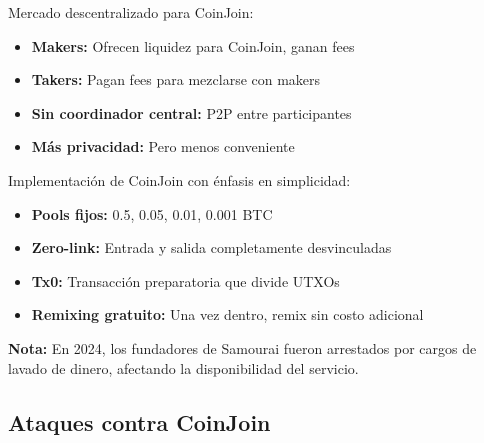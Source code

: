 \documentclass[11pt,a4paper,twoside]{book}
\begin{document}
\begin{definition}[JoinMarket]
Mercado descentralizado para CoinJoin:
\begin{itemize}
    \item \textbf{Makers:} Ofrecen liquidez para CoinJoin, ganan fees
    \item \textbf{Takers:} Pagan fees para mezclarse con makers
    \item \textbf{Sin coordinador central:} P2P entre participantes
    \item \textbf{M\'as privacidad:} Pero menos conveniente
\end{itemize}
\end{definition}

\begin{definition}
Implementaci\'on de CoinJoin con \'enfasis en simplicidad:
\begin{itemize}
    \item \textbf{Pools fijos:} 0.5, 0.05, 0.01, 0.001 BTC
    \item \textbf{Zero-link:} Entrada y salida completamente desvinculadas
    \item \textbf{Tx0:} Transacci\'on preparatoria que divide UTXOs
    \item \textbf{Remixing gratuito:} Una vez dentro, remix sin costo adicional
\end{itemize}

\textbf{Nota:} En 2024, los fundadores de Samourai fueron arrestados por cargos de lavado de dinero, afectando la disponibilidad del servicio.
\end{definition}

\subsection{Ataques contra CoinJoin}
\end{document}
